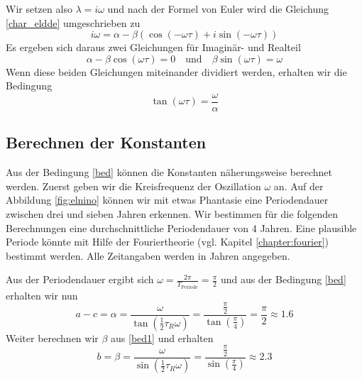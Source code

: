 Wir setzen also $\lambda = i\omega$ und nach der Formel von Euler wird die Gleichung \eqref{char_eldde} umgeschrieben zu 
\begin{equation}
	 i\omega = \alpha-\beta(\cos(-\omega \tau)+i\sin(-\omega \tau))
\end{equation}
Es ergeben sich daraus zwei Gleichungen für Imaginär- und Realteil
\begin{equation} \label{bed1}
  	\alpha-\beta\cos(\omega \tau) = 0 \quad\text{und}\quad \beta\sin(\omega\tau)=\omega
\end{equation}
Wenn diese beiden Gleichungen miteinander dividiert werden, erhalten wir die Bedingung
\begin{equation} \label{bed}
	\tan(\omega\tau)=\frac{\omega}{\alpha}
\end{equation}
 
\subsection{Berechnen der Konstanten}
Aus der Bedingung \eqref{bed} können die Konstanten näherungsweise berechnet werden.
Zuerst geben wir die Kreisfrequenz der Oszillation $\omega$ an. 
Auf der Abbildung \ref{fig:elnino} können wir mit etwas Phantasie eine Periodendauer zwischen drei und sieben Jahren erkennen.
Wir bestimmen für die folgenden Berechnungen eine durchschnittliche Periodendauer von 4 Jahren. 
Eine plausible Periode könnte mit Hilfe der Fouriertheorie (vgl. Kapitel \ref{chapter:fourier}) bestimmt werden.
Alle Zeitangaben werden in Jahren angegeben.

Aus der Periodendauer ergibt sich $\omega = \frac{2\pi}{T_\text{Periode}} = \frac{\pi}{2}$ und aus der Bedingung \eqref{bed} erhalten wir nun 
\begin{equation}
	a-c=\alpha=\frac{\omega}{\tan(\frac{1}{2}\tau_R \omega)}=\frac{\frac{\pi}{2}}{\tan(\frac{\pi}{4})}=\frac{\pi}{2}\approx 1.6
\end{equation}
Weiter berechnen wir $\beta$ aus \eqref{bed1} und erhalten
\begin{equation}
	b=\beta=\frac{\omega}{\sin(\frac{1}{2}\tau_R \omega)}=\frac{\frac{\pi}{2}}{\sin(\frac{\pi}{4})}\approx 2.3
\end{equation}


